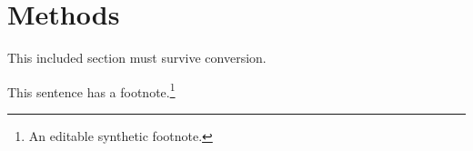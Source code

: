 \section{Methods}
This included section must survive conversion. %

This sentence has a footnote.\footnote{An editable synthetic footnote.}
